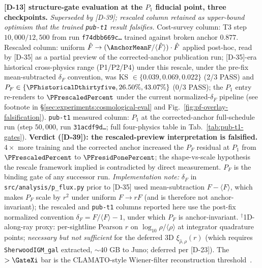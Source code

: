 \begin{table}[t]
    \caption{\textbf{[D-13] structure-gate evaluation at the $P_1$ fiducial point, three checkpoints.} \emph{Superseded by [D-39]; rescaled column retained as upper-bound optimism that the trained \texttt{pub-t1} result falsifies.} Cost-survey column: T3 step $10{,}000/12{,}500$ from run \texttt{f74dbb669c\dots} trained against broken anchor $0.877$. Rescaled column: uniform $\hat{F} \to (\AnchorMeanF/\langle\hat{F}\rangle)\cdot\hat{F}$ applied post-hoc, read by [D-35] as a partial preview of the corrected-anchor publication run; [D-35]-era historical cross-physics range (P1/P2/P4) under this rescale, under the pre-fix mean-subtracted $\delta_F$ convention, was KS $\in\{0.039, 0.069, 0.022\}$ (2/3 PASS) and $P_F\in\{\PFhistoricalDthirtyfive, 26.50\%, 43.07\%\}$ (0/3 PASS); the $P_1$ entry re-renders to $\PFrescaledPercent$ under the current normalized-$\delta_F$ pipeline (see footnote in \S\ref{sec:experiments:cosmological-eval} and Fig.~\ref{fig:pf-overlay-falsification}). \texttt{pub-t1} measured column: $P_1$ at the corrected-anchor full-schedule run (step $50{,}000$, run \texttt{31acdf9d\dots}; full four-physics table in Tab.~\ref{tab:pub-t1-gates}). \textbf{Verdict ([D-39]): the rescaled-preview interpretation is falsified.} $4\times$ more training and the corrected anchor increased the $P_F$ residual at $P_1$ from $\PFrescaledPercent$ to $\PFresidPonePercent$; the shape-vs-scale hypothesis the rescale framework implied is contradicted by direct measurement. $P_F$ is the binding gate of any successor run. \emph{Implementation note:} $\delta_F$ in \texttt{src/analysis/p\_flux.py} prior to [D-35] used mean-subtraction $F-\langle F\rangle$, which makes $P_F$ scale by $r^2$ under uniform $F\to rF$ (and is therefore not anchor-invariant); the rescaled and \texttt{pub-t1} columns reported here use the post-fix normalized convention $\delta_F = F/\langle F\rangle - 1$, under which $P_F$ is anchor-invariant. $^\dagger$1D-along-ray proxy: per-sightline Pearson $r$ on $\log_{10}\rho/\langle\rho\rangle$ at integrator quadrature points; \emph{necessary but not sufficient} for the deferred 3D $\xi_{\hat\rho,\rho}(r)$ (which requires \texttt{SherwoodIGM\_gal} extracted, $\sim 40$ GB to Juno; deferred per [D-23]). The $> \GateXi$ bar is the CLAMATO-style Wiener-filter reconstruction threshold~\cite{lee2015}.}
    \label{tab:d13-gates}
\end{table}


